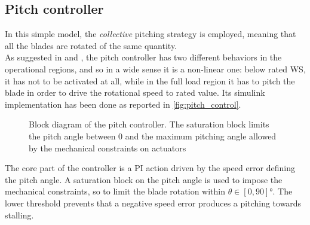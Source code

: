 \subsection{Pitch controller}
In this simple model, the \textit{collective} pitching strategy is employed, meaning that all the blades are rotated of the same quantity.\\
As suggested in \cite{Aerodynamics_of_wind_turbines} and \cite{SMILDEN2016386}, the pitch controller has two different behaviors in the operational regions, and so in a wide sense it is a non-linear one: below rated \acrshort{WS}, it has not to be activated at all, while in the full load region it has to pitch the blade in order to drive the rotational speed to rated value. Its simulink implementation has been done as reported in \autoref{fig:pitch_control}.
\begin{figure}[htb]
    \centering
    
    \caption{Block diagram of the pitch controller. The saturation block limits the pitch angle between 0 and the maximum pitching angle allowed by the mechanical constraints on actuators}
    \label{fig:pitch_control}
\end{figure}

The core part of the controller is a \acrfull{PI} action driven by the speed error defining the pitch angle. A saturation block on the pitch angle is used to impose the mechanical constraints, so to limit the blade rotation within $\theta \in \left[0, 90\right] \si{\degree}$. The lower threshold prevents that a negative speed error produces a pitching towards stalling.

